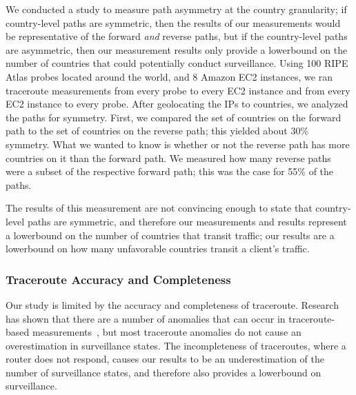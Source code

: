 We conducted a study to measure path asymmetry at the country granularity; if country-level paths are symmetric, then the results of our measurements would be representative of the forward {\it and} reverse paths, but if the country-level paths are asymmetric, then our measurement results only provide a lowerbound on the number of countries that could potentially conduct surveillance.  Using 100 RIPE Atlas probes located around the world, and 8 Amazon EC2 instances, we ran traceroute measurements from every probe to every EC2 instance and from every EC2 instance to every probe.  After geolocating the IPs to countries, we analyzed the paths for symmetry.  First, we compared the set of countries on the forward path to the set of countries on the reverse path; this yielded about 30\% symmetry.  What we wanted to know is whether or not the reverse path has more countries on it than the forward path.  We measured how many reverse paths were a subset of the respective forward path; this was the case for 55\% of the paths.  

The results of this measurement are not convincing enough to state that country-level paths are symmetric, and therefore our measurements and results represent a lowerbound on the number of countries that transit traffic; our results are a lowerbound on how many unfavorable countries transit a client's traffic.

\subsubsection{Traceroute Accuracy and Completeness}
Our study is limited by the accuracy and completeness of traceroute.  Research has shown that there are a number of anomalies that can occur in traceroute-based measurements~\cite{augustin2006avoiding}, but most traceroute anomalies do not cause an overestimation in surveillance states.  The incompleteness of traceroutes, where a router does not respond, causes our results to be an underestimation of the number of surveillance states, and therefore also provides a lowerbound on surveillance.
